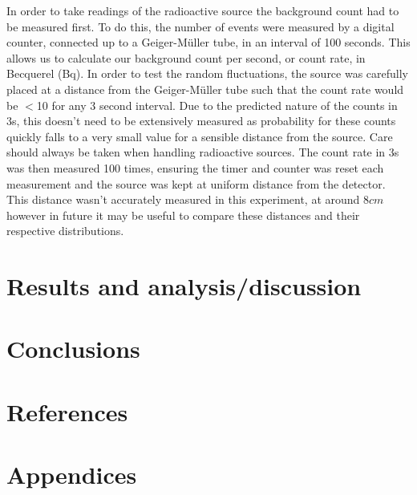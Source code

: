 \documentclass[11pt]{article}
\begin{document}
    \begin{figure}
    \centering
    \def\svgwidth{\columnwidth}
    
    \end{figure}

    In order to take readings of the radioactive source the background count had to be measured first. To do this, the number of events were measured by a digital counter, connected  up to a Geiger-Müller tube, in an interval of 100 seconds. This allows us to calculate our background count per second, or count rate, in Becquerel (Bq). 
    \newline
    In order to test the random fluctuations, the  source was carefully placed at a distance from the Geiger-Müller tube such that the count rate would be $<$10 for any 3 second interval. Due to the predicted nature of the counts in 3s, this doesn't need to be extensively measured as probability for these counts quickly falls to a very small value for a sensible distance from the source. Care should always be taken when handling radioactive sources. 
    \newline
    The count rate in 3s was then measured 100 times, ensuring the timer and counter was reset each measurement and the source was kept at uniform distance from the detector. This distance wasn't accurately measured in this experiment, at around $8 cm$ however in future it may be useful to compare these distances and their respective distributions. 
    \newline 
    
    \section{Results and analysis/discussion}
    
    \section{Conclusions}
    \section{References}
    \section{Appendices}
    
     
\end{document}
